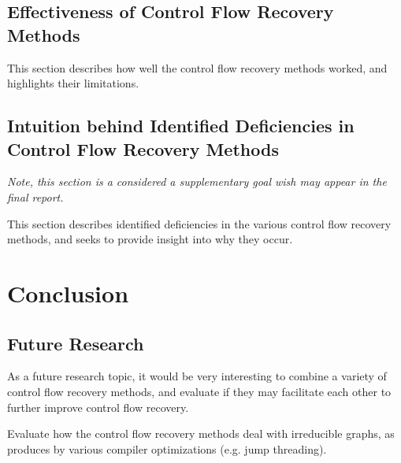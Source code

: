 \documentclass[12pt, a4paper]{article}
\begin{document}
\subsection{Effectiveness of Control Flow Recovery Methods}

This section describes how well the control flow recovery methods worked, and highlights their limitations.

\subsection{Intuition behind Identified Deficiencies in Control Flow Recovery Methods}

\textit{Note, this section is a considered a supplementary goal wish may appear in the final report.}

This section describes identified deficiencies in the various control flow recovery methods, and seeks to provide insight into why they occur.

\clearpage

\section{Conclusion}

\subsection{Future Research}

As a future research topic, it would be very interesting to combine a variety of control flow recovery methods, and evaluate if they may facilitate each other to further improve control flow recovery.

Evaluate how the control flow recovery methods deal with irreducible graphs, as produces by various compiler optimizations (e.g. jump threading).

\clearpage


\end{document}
